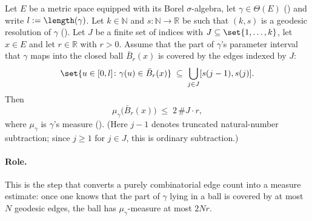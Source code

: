 \begin{helper}
  Let $E$ be a metric space equipped with its Borel $\sigma$-algebra, let $\gamma \in \Theta(E)$
  () and write $l := \length(\gamma)$. Let $k \in \mathbb{N}$ and
  $s \colon \mathbb{N} \to \mathbb{R}$ be such that $(k,s)$ is a geodesic resolution of $\gamma$
  (). Let $J$ be a finite set of indices with
  $J \subseteq \set{1,\dots,k}$, let $x \in E$ and let $r \in \mathbb{R}$ with $r > 0$. Assume that
  the part of $\gamma$'s parameter interval that $\gamma$ maps into the closed ball
  $\bar{B}_r(x)$ is covered by the edges indexed by $J$:
  \[
    \set{ u \in [0,l] \colon \gamma(u) \in \bar{B}_r(x) } \;\subseteq\;
      \bigcup_{j \in J} [s(j-1), s(j)]
    .
  \]
  Then
  \[
    \mu_\gamma\bigl(\bar{B}_r(x)\bigr) \;\leq\; 2 \, \#J \cdot r
    ,
  \]
  where $\mu_\gamma$ is $\gamma$'s measure (). (Here $j-1$ denotes truncated
  natural-number subtraction; since $j \ge 1$ for $j \in J$, this is ordinary subtraction.)

  \paragraph{Role.} This is the step that converts a purely combinatorial edge count into a
  measure estimate: once one knows that the part of $\gamma$ lying in a ball is covered by at most
  $N$ geodesic edges, the ball has $\mu_\gamma$-measure at most $2Nr$.
\end{helper}
